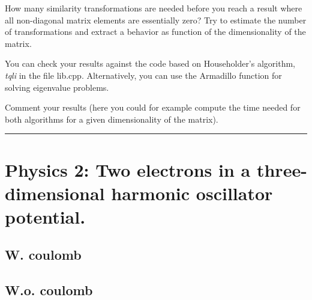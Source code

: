\documentclass[11pt,a4wide]{article}
\begin{document}
How many similarity transformations are needed before you reach a 
result where all non-diagonal matrix elements are essentially zero?
Try to estimate the number of transformations and extract a behavior as function
of the dimensionality of the matrix.

You can check your results against the code based
on Householder's algorithm, {\em tqli} in the file lib.cpp. Alternatively, you can use the Armadillo function for solving 
eigenvalue problems. 

Comment your results (here you could for example compute the time needed for 
both algorithms for a given dimensionality of the matrix).  

\noindent\rule{\textwidth}{1pt}

\section{Physics 2: Two electrons in a three-dimensional harmonic oscillator potential.}
\subsection{W. coulomb}

\subsection{W.o. coulomb}
\end{document}
